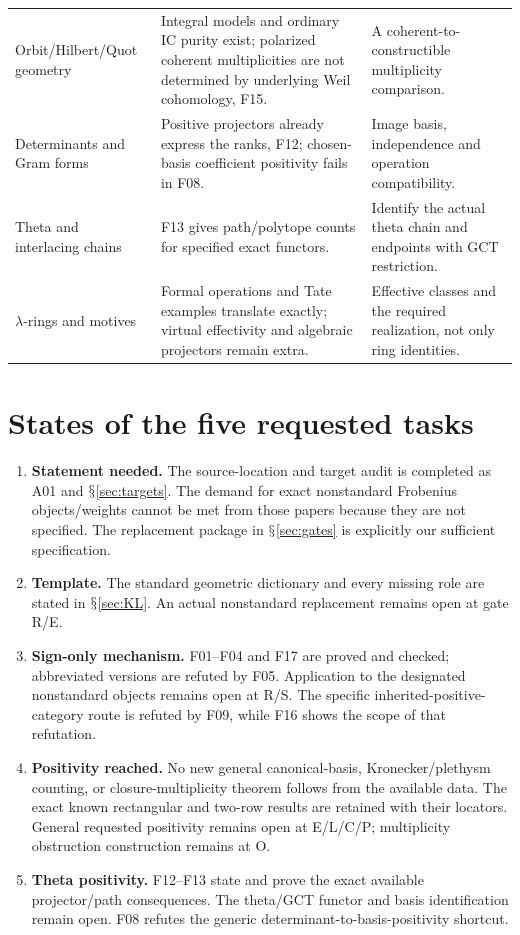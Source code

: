 \documentclass[11pt,a4paper]{article}
\renewcommand{\S}{\ensuremath{\mathsection}}
\theoremstyle{named}\newtheorem{finding}{Finding}[section]
\theoremstyle{definition}\newtheorem{definition}[finding]{Definition}
\theoremstyle{remark}\newtheorem{remark}[finding]{Remark}
\begin{document}
{\begin{longtable}{p{.23\linewidth}p{.40\linewidth}p{.29\linewidth}}
Orbit/Hilbert/Quot geometry&Integral models and ordinary IC purity exist; polarized coherent multiplicities are not determined by underlying Weil cohomology, F15.&A coherent-to-constructible multiplicity comparison.\\
Determinants and Gram forms&Positive projectors already express the ranks, F12; chosen-basis coefficient positivity fails in F08.&Image basis, independence and operation compatibility.\\
Theta and interlacing chains&F13 gives path/polytope counts for specified exact functors.&Identify the actual theta chain and endpoints with GCT restriction.\\
$\lambda$-rings and motives&Formal operations and Tate examples translate exactly; virtual effectivity and algebraic projectors remain extra.&Effective classes and the required realization, not only ring identities.\\\bottomrule
\end{longtable}}

\section{States of the five requested tasks}
\begin{enumerate}
\item \textbf{Statement needed.} The source-location and target audit is completed as A01 and \S\ref{sec:targets}. The demand for exact nonstandard Frobenius objects/weights cannot be met from those papers because they are not specified. The replacement package in \S\ref{sec:gates} is explicitly our sufficient specification.
\item \textbf{Template.} The standard geometric dictionary and every missing role are stated in \S\ref{sec:KL}. An actual nonstandard replacement remains open at gate R/E.
\item \textbf{Sign-only mechanism.} F01--F04 and F17 are proved and checked; abbreviated versions are refuted by F05. Application to the designated nonstandard objects remains open at R/S. The specific inherited-positive-category route is refuted by F09, while F16 shows the scope of that refutation.
\item \textbf{Positivity reached.} No new general canonical-basis, Kronecker/plethysm counting, or closure-multiplicity theorem follows from the available data. The exact known rectangular and two-row results are retained with their locators. General requested positivity remains open at E/L/C/P; multiplicity obstruction construction remains at O.
\item \textbf{Theta positivity.} F12--F13 state and prove the exact available projector/path consequences. The theta/GCT functor and basis identification remain open. F08 refutes the generic determinant-to-basis-positivity shortcut.
\end{enumerate}
\end{document}
